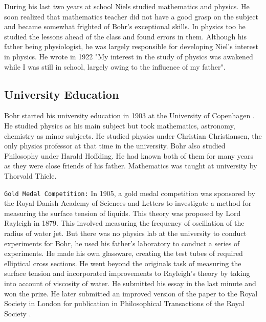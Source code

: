 \documentclass[11pt, article]{scrartcl}
\begin{document}
During his last two years at school Niels studied mathematics and physics. He soon realized
that mathematics teacher did not have a good grasp on the subject and became somewhat
frighted of Bohr's exceptional skills. In physics too he studied the lessons ahead of the
class and found errors in them. Although his father being physiologist, he was largely responsible for developing Niel's interest in physics.\cite{physics}
He wrote in 1922 "My interest in the study of physics was awakened while I was still in school, largely owing to the influence of my father"\cite{kennedy}.


\subsection{University Education}
Bohr started his university education in 1903 at the University of Copenhagen \cite{kennedy}. He studied
physics as his main subject but took mathematics, astronomy, chemistry as minor subjects.
He studied physics under Christian Christiansen, the only physics professor at that time
in the university. Bohr also studied Philosophy under Harald Hoffding. He had known both of them for many years as they were close friends of his father. 
Mathematics was taught at university by Thorvald Thiele\cite{kennedy}.

\texttt{Gold Medal Competition:}
	In 1905, a gold medal competition was sponsored by the Royal Danish Academy of Sciences and
	Letters to investigate a method for measuring the surface tension of liquids\cite{archives}. This theory
	was proposed by Lord Rayleigh in 1879. This involved measuring the frequency of oscillation
	of the radius of water jet. But there was no physics lab at the university to conduct
	experiments for Bohr, he used his father's laboratory to conduct a series of experiments.
	He made his own glassware, creating the test tubes of required elliptical cross sections. He went beyond the originals task of 
	measuring the surface tension and incorporated improvements to Rayleigh's theory by taking into account of viscosity of water. 
	He submitted his essay in the last minute and won the prize. He later submitted an improved version of the paper to the Royal 
	Society in London for publication in  Philosophical Transactions of the Royal Society \cite{student}.
\end{document}
